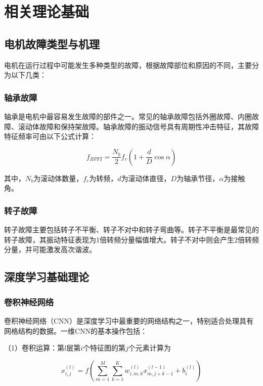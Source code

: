 \chapter{相关理论基础}

\section{电机故障类型与机理}

电机在运行过程中可能发生多种类型的故障，根据故障部位和原因的不同，主要分为以下几类：

\subsection{轴承故障}

轴承是电机中最容易发生故障的部件之一。常见的轴承故障包括外圈故障、内圈故障、滚动体故障和保持架故障。轴承故障的振动信号具有周期性冲击特征，其故障特征频率可由以下公式计算：

\begin{equation}
	f_{BPFI} = \frac{N_b}{2} f_r \left(1 + \frac{d}{D} \cos\alpha\right)
	\label{eq:bpfi}
\end{equation}

其中，$N_b$为滚动体数量，$f_r$为转频，$d$为滚动体直径，$D$为轴承节径，$\alpha$为接触角。

\subsection{转子故障}

转子故障主要包括转子不平衡、转子不对中和转子弯曲等。转子不平衡是最常见的转子故障，其振动特征表现为1倍转频分量幅值增大。转子不对中则会产生2倍转频分量，并可能激发高次谐波。

\section{深度学习基础理论}

\subsection{卷积神经网络}

卷积神经网络（CNN）是深度学习中最重要的网络结构之一，特别适合处理具有网格结构的数据。一维CNN的基本操作包括：

（1）卷积运算：第$l$层第$i$个特征图的第$j$个元素计算为

\begin{equation}
	x_{i,j}^{(l)} = f\left(\sum_{m=1}^{M} \sum_{k=1}^{K} w_{i,m,k}^{(l)} x_{m,j+k-1}^{(l-1)} + b_i^{(l)}\right)
	\label{eq:conv1d}
\end{equation}

